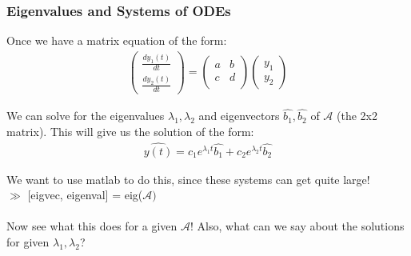 \documentclass{beamer}
\begin{document}
\begin{frame}
\frametitle{Eigenvalues and Systems of ODEs} 
Once we have a matrix equation of the form: \\
\begin{align*}
\left(\begin{matrix}
\frac{dy_1(t)}{dt}\\
\frac{dy_2(t)}{dt}
\end{matrix} \right)
=
\left(\begin{matrix}
a & b \\
c & d \\
\end{matrix}\right)
\left(\begin{matrix}
y_1\\
y_2
\end{matrix}\right)
\end{align*}

We can solve for the eigenvalues $\lambda_1,\lambda_2$  and eigenvectors $\hat{b_1},\hat{b_2}$ of $\mathcal{A}$ (the 2x2 matrix). This will give us the solution of the form: 
\begin{align*}
\hat{y(t)} = c_1e^{\lambda_1 t}\hat{b_1} + c_2 e^{\lambda_2 t}\hat{b_2}
\end{align*}

We want to use matlab to do this, since these systems can get quite large! \\

 $\gg$ [eigvec, eigenval] = eig($\mathcal{A})$\\
\ \\
Now see what this does for a given $\mathcal{A}$! Also, what can we say about the solutions for given $\lambda_1,\lambda_2$? 

\end{frame}
\end{document}
